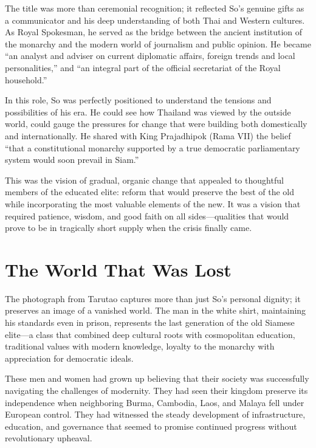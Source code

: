 \documentclass[
  Letterpaper,
]{scrbook}
\begin{document}
The title was more than ceremonial recognition; it reflected So's
genuine gifts as a communicator and his deep understanding of both Thai
and Western cultures. As Royal Spokesman, he served as the bridge
between the ancient institution of the monarchy and the modern world of
journalism and public opinion. He became ``an analyst and adviser on
current diplomatic affairs, foreign trends and local personalities,''
and ``an integral part of the official secretariat of the Royal
household.''

In this role, So was perfectly positioned to understand the tensions and
possibilities of his era. He could see how Thailand was viewed by the
outside world, could gauge the pressures for change that were building
both domestically and internationally. He shared with King Prajadhipok
(Rama VII) the belief ``that a constitutional monarchy supported by a
true democratic parliamentary system would soon prevail in Siam.''

This was the vision of gradual, organic change that appealed to
thoughtful members of the educated elite: reform that would preserve the
best of the old while incorporating the most valuable elements of the
new. It was a vision that required patience, wisdom, and good faith on
all sides---qualities that would prove to be in tragically short supply
when the crisis finally came.

\section{The World That Was Lost}\label{the-world-that-was-lost}

The photograph from Tarutao captures more than just So's personal
dignity; it preserves an image of a vanished world. The man in the white
shirt, maintaining his standards even in prison, represents the last
generation of the old Siamese elite---a class that combined deep
cultural roots with cosmopolitan education, traditional values with
modern knowledge, loyalty to the monarchy with appreciation for
democratic ideals.

These men and women had grown up believing that their society was
successfully navigating the challenges of modernity. They had seen their
kingdom preserve its independence when neighboring Burma, Cambodia,
Laos, and Malaya fell under European control. They had witnessed the
steady development of infrastructure, education, and governance that
seemed to promise continued progress without revolutionary upheaval.
\end{document}
